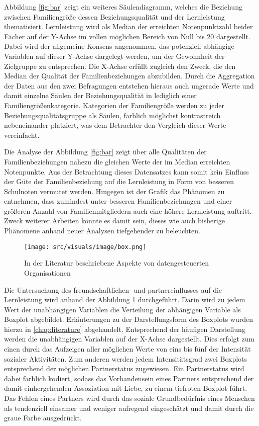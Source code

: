 Abbildung \ref{fig:bar} zeigt ein weiteres Säulendiagramm, welches die Beziehung zwischen Familiengröße dessen Beziehungsqualität und der Lernleistung thematisiert.
Lernleistung wird als Median der erreichten Notenpunktzahl beider Fächer auf der Y-Achse im vollen möglichen Bereich von Null bis 20 dargestellt.
Dabei wird der allgemeine Konsens angenommen, das potenziell abhängige Variablen auf dieser Y-Achse dargelegt werden, um der Gewohnheit der Zielgruppe zu entsprechen.
Die X-Achse erfüllt zugleich den Zweck, die den Median der Qualität der Familienbeziehungen abzubilden.
Durch die Aggregation der Daten aus den zwei Befragungen entstehen hieraus auch ungerade Werte und damit einzelne Säulen der Beziehungsqualität in lediglich einer Familiengrößenkategorie.
Kategorien der Familiengröße werden zu jeder Beziehungsqualitätsgruppe als Säulen, farblich möglichst kontrastreich nebeneinander platziert, was dem Betrachter den Vergleich dieser Werte vereinfacht. 

Die Analyse der Abbildung \ref{fig:bar} zeigt über alle Qualitäten der Familienbeziehungen nahezu die gleichen Werte der im Median erreichten Notenpunkte.
Aus der Betrachtung dieses Datensatzes kann somit kein Einfluss der Güte der Familienbeziehung auf die Lernleistung in Form von besseren Schulnoten vermutet werden.
Hingegen ist der Grafik das Phänomen zu entnehmen, dass zumindest unter besseren Familienbeziehungen und einer größeren Anzahl von Familienmitgliedern auch eine höhere Lernleistung auftritt.
Zweck weiterer Arbeiten könnte es damit sein, dieses wie auch bisherige Phänomene anhand neuer Analysen tiefgehender zu beleuchten.

\begin{figure}[htb]
    \centering
    \texttt{[image: src/visuals/image/box.png]}
    \caption{In der Literatur beschriebene Aspekte von datengesteuerten Organisationen}
    \label{fig:box}
\end{figure}

Die Untersuchung des freundschaftlichen- und partnereinflusses auf die Lernleistung wird anhand der Abbildung \ref{fig:box} durchgeführt.
Darin wird zu jedem Wert der unabhängigen Variablen die Verteilung der abhängigen Variable als Boxplot abgebildet.
Erläuterungen zu der Darstellungsform des Boxplots wurden hierzu in \autoref{chap:literature} abgehandelt.
Entsprechend der häufigen Darstellung werden die unabhängigen Variablen auf der X-Achse dargestellt.
Dies erfolgt zum einen durch das Aufzeigen aller möglichen Werte von eins bis fünf der Intensität sozialer Aktivitäten.
Zum anderen werden jedem Intensitätsgrad zwei Boxplots entsprechend der möglichen Partnerstatus zugewiesen.
Ein Partnerstatus wird dabei farblich kodiert, sodass das Vorhandensein eines Partners entsprechend der damit einhergehenden Assoziation mit Liebe, zu einem tiefroten Boxplot führt.
Das Fehlen eines Partners wird durch das soziale Grundbedürfnis eines Menschen als tendenziell einsamer und weniger aufregend eingeschätzt und damit durch die graue Farbe ausgedrückt.

